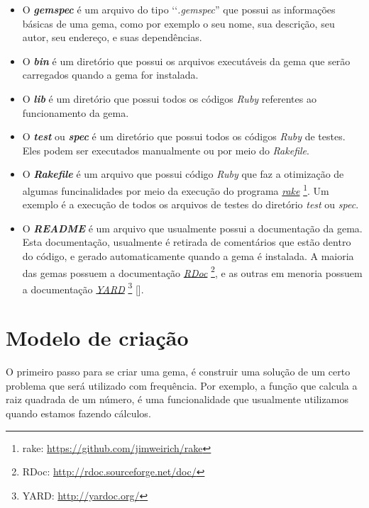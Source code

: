 \begin{itemize}

 \item O \emph{\textbf{gemspec}} é um arquivo do tipo ‘‘\emph{.gemspec}'' que possui as informações básicas 
 de uma gema, como por exemplo o seu nome, sua descrição, seu autor, seu endereço, e suas dependências.

 \item O \emph{\textbf{bin}} é um diretório que possui os arquivos executáveis da gema que serão 
 carregados quando a gema for instalada.

 \item O \emph{\textbf{lib}} é um diretório que possui todos os códigos \emph{Ruby} referentes ao 
 funcionamento da gema.

 \item O \emph{\textbf{test}} ou \emph{\textbf{spec}} é um diretório que possui todos os códigos \emph{Ruby} 
 de testes. Eles podem ser executados manualmente ou por meio do \emph{Rakefile}.

 \item O \emph{\textbf{Rakefile}} é um arquivo que possui código \emph{Ruby} que faz a otimização de algumas
 funcinalidades por meio da execução do programa \emph{\href{https://github.com/jimweirich/rake}{rake}} 
\footnote{rake: \url{https://github.com/jimweirich/rake}}. Um exemplo é a execução de todos os arquivos 
de testes do diretório \emph{test} ou \emph{spec}.

 \item O \emph{\textbf{README}} é um arquivo que usualmente possui a documentação da gema. Esta
 documentação, usualmente é retirada de comentários que estão dentro do código, e gerado automaticamente
 quando a gema é instalada. A maioria das gemas possuem a documentação
 \emph{\href{http://rdoc.sourceforge.net/doc/}{RDoc}} \footnote{RDoc: \url{http://rdoc.sourceforge.net/doc/}},
 e as outras em menoria possuem a documentação \emph{\href{http://yardoc.org/}{YARD}}
 \footnote{YARD: \url{http://yardoc.org/}} [].

\end{itemize}

\section{Modelo de criação}
\label{section:modelo_de_criação}

O primeiro passo para se criar uma gema, é construir uma solução de um certo problema que será utilizado
com frequência. Por exemplo, a função que calcula a raiz quadrada de um número, é uma funcionalidade que 
usualmente utilizamos quando estamos fazendo cálculos. 

